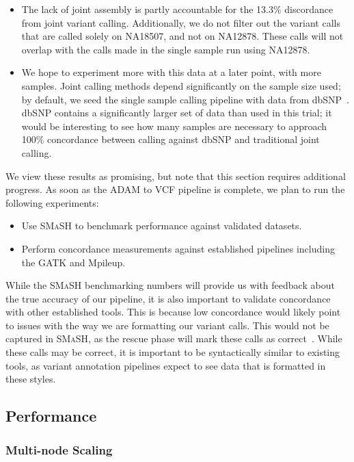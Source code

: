 \documentclass{acm_proc_article-sp}
\begin{document}
\begin{itemize}
\item The lack of joint assembly is partly accountable for the 13.3\% discordance from joint variant calling. Additionally, we do not filter out the
variant calls that are called solely on NA18507, and not on NA12878. These calls will not overlap with the calls made in the single sample
run using NA12878.
\item We hope to experiment more with this data at a later point, with more samples. Joint calling methods depend significantly on the sample
size used; by default, we seed the single sample calling pipeline with data from dbSNP~\cite{sherry01}. dbSNP contains a significantly larger
set of data than used in this trial; it would be interesting to see how many samples are necessary to approach 100\% concordance between
calling against dbSNP and traditional joint calling.
\end{itemize}

We view these results as promising, but note that this section requires additional progress. As soon as the ADAM to VCF pipeline is complete,
we plan to run the following experiments:

\begin{itemize}
\item Use \textsc{SMaSH} to benchmark performance against validated datasets.
\item Perform concordance measurements against established pipelines including the GATK and Mpileup.
\end{itemize}

While the \textsc{SMaSH} benchmarking numbers will provide us with feedback about the true accuracy of our pipeline, it is also important
to validate concordance with other established tools. This is because low concordance would likely point to issues with the way we are formatting
our variant calls. This would not be captured in \textsc{SMaSH}, as the rescue phase will mark these calls as correct~\cite{talwalkar13}. While
these calls may be correct, it is important to be syntactically similar to existing tools, as variant annotation pipelines expect to see data that
is formatted in these styles.

\subsection{Performance}
\label{sec:performance}



\subsubsection{Multi-node Scaling}
\label{sec:multi-node-scaling}
\end{document}
